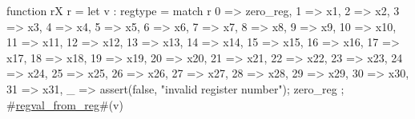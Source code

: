 function rX r = {
  let v : regtype =
    match r {
      0 => zero_reg,
      1 => x1,
      2 => x2,
      3 => x3,
      4 => x4,
      5 => x5,
      6 => x6,
      7 => x7,
      8 => x8,
      9 => x9,
      10 => x10,
      11 => x11,
      12 => x12,
      13 => x13,
      14 => x14,
      15 => x15,
      16 => x16,
      17 => x17,
      18 => x18,
      19 => x19,
      20 => x20,
      21 => x21,
      22 => x22,
      23 => x23,
      24 => x24,
      25 => x25,
      26 => x26,
      27 => x27,
      28 => x28,
      29 => x29,
      30 => x30,
      31 => x31,
      _  => {assert(false, "invalid register number"); zero_reg}
    };
  #\hyperref[sailRISCVzregvalzyfromzyreg]{regval\_from\_reg}#(v)
}
